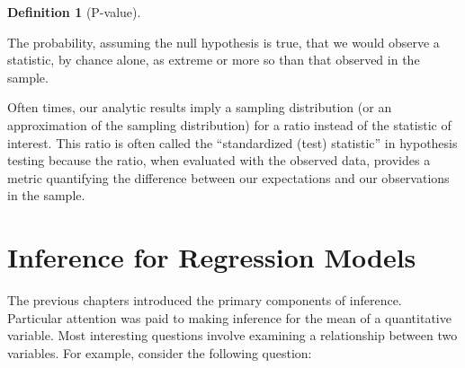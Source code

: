 \documentclass[
  letterpaper,
  DIV=11,
  numbers=noendperiod]{scrreprt}
\theoremstyle{definition}
\newtheorem{definition}{Definition}[chapter]
\theoremstyle{plain}
\theoremstyle{definition}
\theoremstyle{remark}
\begin{document}
\begin{definition}[P-value]\protect\hypertarget{def-pvalue}{}\label{def-pvalue}

The probability, assuming the null hypothesis is true, that we would
observe a statistic, by chance alone, as extreme or more so than that
observed in the sample.

\end{definition}

\begin{tcolorbox}[enhanced jigsaw, breakable, colframe=quarto-callout-note-color-frame, titlerule=0mm, arc=.35mm, coltitle=black, opacitybacktitle=0.6, leftrule=.75mm, opacityback=0, left=2mm, toprule=.15mm, colbacktitle=quarto-callout-note-color!10!white, title=\textcolor{quarto-callout-note-color}{\faInfo}\hspace{0.5em}{Note}, bottomtitle=1mm, toptitle=1mm, rightrule=.15mm, bottomrule=.15mm, colback=white]

Often times, our analytic results imply a sampling distribution (or an
approximation of the sampling distribution) for a ratio instead of the
statistic of interest. This ratio is often called the ``standardized
(test) statistic'' in hypothesis testing because the ratio, when
evaluated with the observed data, provides a metric quantifying the
difference between our expectations and our observations in the sample.

\end{tcolorbox}


\chapter{Inference for Regression Models}\label{sec-regression}

\providecommand{\norm}[1]{\left\lVert#1\right\rVert}
\providecommand{\abs}[1]{\left\lvert#1\right\rvert}
\providecommand{\dist}[1]{\stackrel{\text{#1}}{\sim}}
\providecommand{\ind}[1]{\mathbb{I}\left(#1\right)}
\providecommand{\bm}[1]{\mathbf{#1}}
\providecommand{\bs}[1]{\boldsymbol{#1}}
\providecommand{\Ell}{\mathcal{L}}
\providecommand{\indep}{\perp\negthickspace\negmedspace\perp}

The previous chapters introduced the primary components of inference.
Particular attention was paid to making inference for the mean of a
quantitative variable. Most interesting questions involve examining a
relationship between two variables. For example, consider the following
question:
\end{document}
